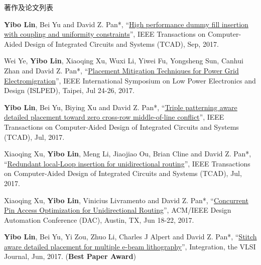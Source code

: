 \begin{rSection}{著作及论文列表}
\begin{description}[font=\normalfont, rightmargin=2em]
\item[{[J18]}]{
        \textbf{Yibo Lin}, Bei Yu and David Z. Pan*, 
    ``\href{http://dx.doi.org/10.1109/TCAD.2016.2638452}{High performance dummy fill insertion with coupling and uniformity constraints}'', 
    IEEE Transactions on Computer-Aided Design of Integrated Circuits and Systems (TCAD), Sep, 2017.
    
}
            

\item[{[C17]}]{
        Wei Ye, \textbf{Yibo Lin}, Xiaoqing Xu, Wuxi Li, Yiwei Fu, Yongsheng Sun, Canhui Zhan and David Z. Pan*, 
    ``\href{https://doi.org/10.1109/ISLPED.2017.8009178}{Placement Mitigation Techniques for Power Grid Electromigration}'', 
    IEEE International Symposium on Low Power Electronics and Design (ISLPED), Taipei, Jul 24-26, 2017.
    
}
            

\item[{[J16]}]{
        \textbf{Yibo Lin}, Bei Yu, Biying Xu and David Z. Pan*, 
    ``\href{http://dx.doi.org/10.1109/TCAD.2017.2648843}{Triple patterning aware detailed placement toward zero cross-row middle-of-line conflict}'', 
    IEEE Transactions on Computer-Aided Design of Integrated Circuits and Systems (TCAD), Jul, 2017.
    
}
            

\item[{[J15]}]{
        Xiaoqing Xu, \textbf{Yibo Lin}, Meng Li, Jiaojiao Ou, Brian Cline and David Z. Pan*, 
    ``\href{http://dx.doi.org/10.1109/TCAD.2017.2651811}{Redundant local-Loop insertion for unidirectional routing}'', 
    IEEE Transactions on Computer-Aided Design of Integrated Circuits and Systems (TCAD), Jul, 2017.
    
}
            

\item[{[C14]}]{
        Xiaoqing Xu, \textbf{Yibo Lin}, Vinicius Livramento and David Z. Pan*, 
    ``\href{https://doi.org/10.1145/3061639.3062214}{Concurrent Pin Access Optimization for Unidirectional Routing}'', 
    ACM/IEEE Design Automation Conference (DAC), Austin, TX, Jun 18-22, 2017.
    
}
            

\item[{[J13]}]{
        \textbf{Yibo Lin}, Bei Yu, Yi Zou, Zhuo Li, Charles J Alpert and David Z. Pan*, 
    ``\href{http://dx.doi.org/10.1016/j.vlsi.2017.02.004}{Stitch aware detailed placement for multiple e-beam lithography}'', 
    Integration, the VLSI Journal, Jun, 2017.
    (\textbf{Best Paper Award})
}
            


\end{description}
\end{rSection}
